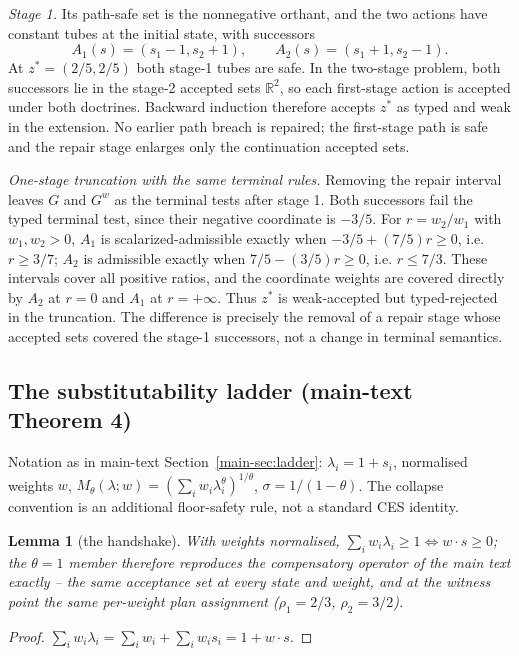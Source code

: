 \documentclass[preprint,11pt,authoryear]{elsarticle}
\newtheorem{lemma}{Lemma}
\theoremstyle{remark}
\begin{document}
\emph{Stage 1.} Its path-safe set is the nonnegative orthant, and the two actions have constant tubes at the initial state, with successors
\[
A_1(s)=(s_1-1,s_2+1),\qquad A_2(s)=(s_1+1,s_2-1).
\]
At $z^*=(2/5,2/5)$ both stage-1 tubes are safe. In the two-stage problem, both successors lie in the stage-2 accepted sets $\mathbb R^2$, so each first-stage action is accepted under both doctrines. Backward induction therefore accepts $z^*$ as typed and weak in the extension. No earlier path breach is repaired; the first-stage path is safe and the repair stage enlarges only the continuation accepted sets.

\emph{One-stage truncation with the same terminal rules.} Removing the repair interval leaves $G$ and $G^w$ as the terminal tests after stage 1. Both successors fail the typed terminal test, since their negative coordinate is $-3/5$. For $r=w_2/w_1$ with $w_1,w_2>0$, $A_1$ is scalarized-admissible exactly when $-3/5+(7/5)r\ge0$, i.e. $r\ge3/7$; $A_2$ is admissible exactly when $7/5-(3/5)r\ge0$, i.e. $r\le7/3$. These intervals cover all positive ratios, and the coordinate weights are covered directly by $A_2$ at $r=0$ and $A_1$ at $r=+\infty$. Thus $z^*$ is weak-accepted but typed-rejected in the truncation. The difference is precisely the removal of a repair stage whose accepted sets covered the stage-1 successors, not a change in terminal semantics.

\subsection{The substitutability ladder (main-text Theorem 4)}\label{si:ladderproofs}

Notation as in main-text Section~\ref{main-sec:ladder}: $\lambda_i=1+s_i$, normalised weights $w$, $M_\theta(\lambda;w)=(\sum_iw_i\lambda_i^\theta)^{1/\theta}$, $\sigma=1/(1-\theta)$. The collapse convention is an additional floor-safety rule, not a standard CES identity.

\begin{lemma}[the handshake]\label{lem:handshake}
With weights normalised, $\sum_iw_i\lambda_i\ge1\iff w\cdot s\ge0$; the $\theta=1$ member therefore reproduces the compensatory operator of the main text exactly -- the same acceptance set at every state and weight, and at the witness point the same per-weight plan assignment ($\rho_1=2/3$, $\rho_2=3/2$).
\end{lemma}
\begin{proof}
$\sum_iw_i\lambda_i=\sum_iw_i+\sum_iw_is_i=1+w\cdot s$.
\end{proof}
\end{document}
